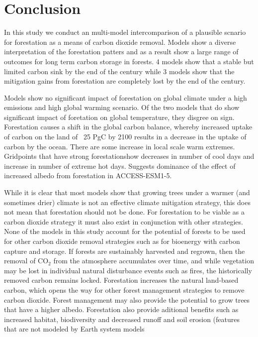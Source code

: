 \documentclass[]{article}
\begin{document}
\section{Conclusion}

In this study we conduct an multi-model intercomparison of a plausible scnario for forestation as a means of carbon dioxide removal.
Models show a diverse interpretation of the forestation patters and as a result show a large range of outcomes for long term carbon storage in forests.
4 models show that a stable but limited carbon sink by the end of the century while 3 models show that the mitigation gains from forestation are completely lost by the end of the century.

Models show no significant impact of forestation on global climate under a high emissions and high global warming scenario. Of the two models that do show significant impact of foretation on global temperature, they disgree on sign.
Forestation causes a shift in the global carbon balance, whereby increased uptake of carbon on the land of ~25 PgC by 2100 results in a decrease in the uptake of carbon by the ocean.
There are some increase in local scale warm extremes. Gridpoints that have strong forestationshow decreases in number of cool days and increase in number of extreme hot days. Suggests dominance of the effect of increased albedo from forestation in ACCESS-ESM1-5.

While it is clear that most models show that growing trees under a warmer (and sometimes drier) climate is not an effective climate mitigation strategy, this does not mean that forestation should not be done.
For forestation to be viable as a carbon dioxide strategy it must also exist in conjunction with other strategies.
None of the models in this study account for the potential of forests to be used for other carbon dioxide removal strategies such as for bioenergy with carbon capture and storage.
If forests are sustainably harvested and regrown, then the removal of CO$_2$ from the atmosphere accumulates over time, and while vegetation may be lost in individual natural disturbance events such as fires, the historically removed carbon remains locked.
Forestation increases the natural land-based carbon, which opens the way for other forest management strategies to remove carbon dioxide.
Forest management may also provide the potential to grow trees that have a higher albedo.
Forestation also provide aditional benefits such as increased habitat, biodiversity and decreased runoff and soil erosion (features that are not modeled by Earth system models
\end{document}
